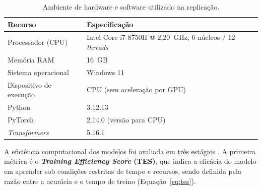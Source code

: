 \documentclass[12pt]{article}
\begin{document}
        \begin{table}[htb]
            \centering
            \caption{Ambiente de hardware e software utilizado na replicação.}
            \label{tab:ambiente}
            \begin{tabular}{ll}
            \hline
            \textbf{Recurso} & \textbf{Especificação} \\
            \hline
            Processador (CPU) & Intel Core i7-8750H @ 2,20~GHz, 6 núcleos / 12 \textit{threads} \\
            Memória RAM & 16~GB \\
            Sistema operacional & Windows 11 \\
            Dispositivo de execução & CPU (sem aceleração por GPU) \\
            Python & 3.12.13 \\
            PyTorch & 2.14.0 (versão para CPU) \\
            \textit{Transformers} & 5.16.1 \\
            \hline
            \end{tabular}
        \end{table}

        
        A eficiência computacional dos modelos foi avaliada em três estágios \cite{bispo2025philder}. A primeira métrica é o \textbf{\textit{Training Efficiency Score} (TES)}, que indica a eficácia do modelo em aprender sob condições restritas de tempo e recursos, sendo definida pela razão entre a acurácia e o tempo de treino (Equação~\ref{eq:tes}).
\end{document}
